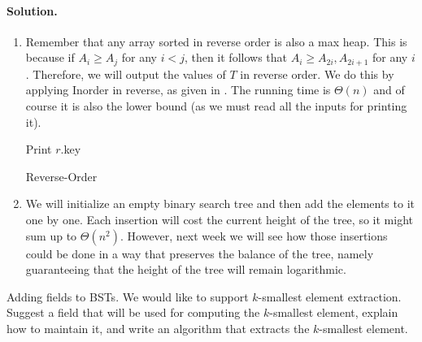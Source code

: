 \paragraph{Solution.} 
  \begin{enumerate}
    \item Remember that any array sorted in reverse order is also a max heap. This is because if $A_{i} \ge A_{j}$ for any $i < j$, then it follows that $A_{i} \ge A_{2i}, A_{2i+1}$ for any $i$. Therefore, we will output the values of $T$ in reverse order. We do this by applying Inorder in reverse, as given in . The running time is $\Theta(n)$ and of course it is also the lower bound (as we must read all the inputs for printing it).
      \begin{algorithm}
       
       Print $r$.key \\
        \caption{Reverse-Order }
\label{alg:treetoheap}
      \end{algorithm}
    \item We will initialize an empty binary search tree and then add the elements to it one by one. Each insertion will cost the current height of the tree, so it might sum up to $\Theta(n^{2})$. However, next week we will see how those insertions could be done in a way that preserves the balance of the tree, namely guaranteeing that the height of the tree will remain logarithmic.
  \end{enumerate}

\begin{example} Adding fields to BSTs. We would like to support $k$-smallest element extraction. Suggest a field that will be used for computing the $k$-smallest element, explain how to maintain it, and write an algorithm that extracts the $k$-smallest element. 
\end{example}

